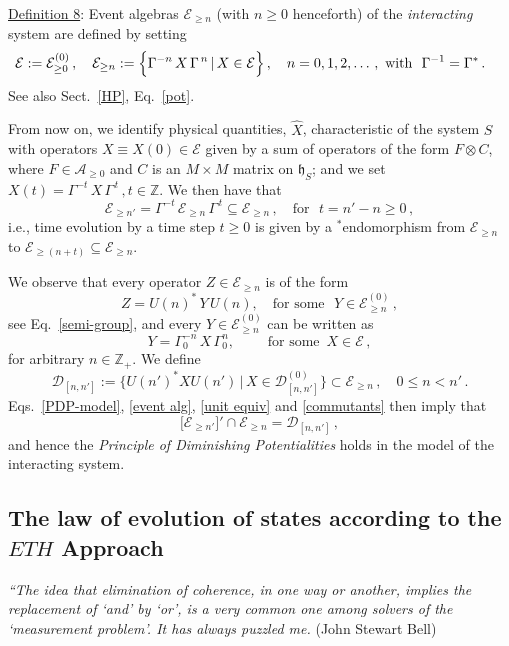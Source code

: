 \documentclass[a4paper,11pt]{article}
\begin{document}
\underline{Definition 8}:  Event algebras $\mathcal{E}_{\geq n}$ (with $n\geq 0$ henceforth) of the \textit{interacting} system are defined by setting
\begin{equation}\label{event alg}
\mathcal{E}:= \mathcal{E}_{\geq 0}^{(0)}\,, \quad \mathcal{E}_{\geq n} := \Big\{\Gamma^{-n}\, X\, \Gamma^{\,n}\, \vert\, X \in \mathcal{E} \Big\}\,,\quad n=0,1,2,\dots\,, \text{\,\,with\,\,\,\,}\Gamma^{-1}= \Gamma^{*}\,. \quad\,\, \square
\end{equation}
See also Sect.~\ref{HP}, Eq.~\eqref{pot}.

From now on, we identify physical quantities, $\hat{X}$, characteristic of the system $S$ with operators $X\equiv X(0) \in 
\mathcal{E}$ given by a sum of operators of the form $F\otimes C$, where $F\in \mathcal{A}_{\geq 0}$ and $C$ is 
an $M\times M$ matrix on $\mathfrak{h}_S$; and we set $X(t)= \Gamma^{-t}\,X\,\Gamma^{\,t}\,, t\in \mathbb{Z}.$ We then have that
$$\mathcal{E}_{\geq n'} = \Gamma^{-t}\, \mathcal{E}_{\geq n} \, \Gamma^{\,t} \subseteq \mathcal{E}_{\geq n}\,, \quad \text{for  }\,\, t= n'-n\geq 0\,,$$
i.e., time evolution by a time step $t\geq 0$ is given by a $^{*}$endomorphism from $\mathcal{E}_{\geq n}$ to 
$\mathcal{E}_{\geq (n+t)}\subseteq \mathcal{E}_{\geq n}$.

We observe that every operator $Z\in \mathcal{E}_{\geq n}$ is of the form
\begin{equation}\label{unit equiv}
Z= U(n)^{*}\, Y \,U(n),\quad \text{for some }\,\, Y\in \mathcal{E}_{\geq n}^{(0)}\,, 
\end{equation}
see Eq.~\eqref{semi-group}, and every $Y\in \mathcal{E}_{\geq n}^{(0)}$ can be written as
\begin{equation}\label{conjugation}
Y= \Gamma_{0}^{-n}\,X\,\Gamma_{0}^{n}, \qquad \text{  for some  }\, X\in \mathcal{E}\,,
\end{equation}
for arbitrary $n\in \mathbb{Z}_{+}$. We define 
\begin{equation}\label{commutants}
\mathcal{D}_{[n,n']}:= \big\{U(n')^{*} X U(n')\,\vert\, X \in \mathcal{D}_{[n,n']}^{(0)}\big\} \subset \mathcal{E}_{\geq n}\,, 
\quad 0\leq n<n'\,.
\end{equation}
Eqs.~\eqref{PDP-model}, \eqref{event alg}, \eqref{unit equiv} and \eqref{commutants} then imply that
$$\big[\mathcal{E}_{\geq n'}\big]' \cap \mathcal{E}_{\geq n} = \mathcal{D}_{[n,n']}\,,$$
and hence the \textit{Principle of Diminishing Potentialities} holds in the model of the interacting system.

\subsection{The law of evolution of states according to the $ETH$ Approach}
\hspace{0.5cm}\textit{``The idea that elimination of coherence, in one way or another, implies the replacement of `and' by `or', is a very common one among solvers of the `measurement problem'. It has always puzzled me.} (John Stewart Bell)\\
\end{document}
